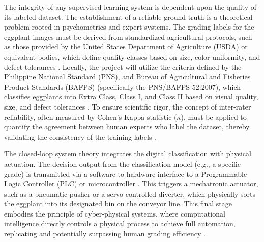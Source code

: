 {The integrity of any supervised learning system is dependent upon the quality of its labeled dataset. The establishment of a reliable ground truth is a theoretical problem rooted in psychometrics and expert systems. The grading labels for the eggplant images must be derived from standardized agricultural protocols, such as those provided by the United States Department of Agriculture (USDA) or equivalent bodies, which define quality classes based on size, color uniformity, and defect tolerances \citep{USDA2013EggplantStandards}. Locally, the project will utilize the criteria defined by the Philippine National Standard (PNS), and Bureau of Agricultural and Fisheries Product Standards (BAFPS) (specifically the PNS/BAFPS 52:2007), which classifies eggplants into Extra Class, Class I, and Class II based on visual quality, size, and defect tolerances \citep{PNSBAFPS522007_Eggplant,BAFS2019PhilGAP}. To ensure scientific rigor, the concept of inter-rater reliability, often measured by Cohen’s Kappa statistic ($\kappa$), must be applied to quantify the agreement between human experts who label the dataset, thereby validating the consistency of the training labels \citep{mchugh2012interrater,he2022cohens}.

The closed-loop system theory integrates the digital classification with physical actuation. The decision output from the classification model (e.g., a specific grade) is transmitted via a software-to-hardware interface to a Programmable Logic Controller (PLC) or microcontroller \citep{bolton2015programmable}. This triggers a mechatronic actuator, such as a pneumatic pusher or a servo-controlled diverter, which physically sorts the eggplant into its designated bin on the conveyor line. This final stage embodies the principle of cyber-physical systems, where computational intelligence directly controls a physical process to achieve full automation, replicating and potentially surpassing human grading efficiency \citep{lee2008cyber,zhang2022advancements}.

}